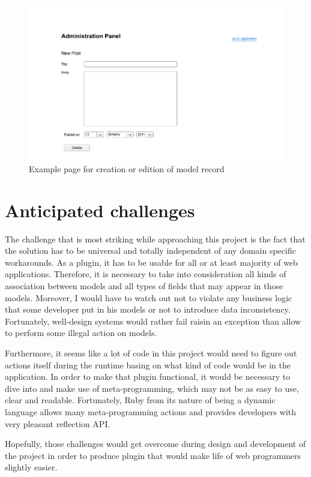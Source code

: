 	\begin{figure}[hbt!]
		\begin{center}
			\includegraphics[width=\linewidth]{images/chapter02/mockup03.png}
			\caption{Example page for creation or edition of model record}
			\label{mockup03}
		\end{center}
	\end{figure}
	
	\section{Anticipated challenges}
	The challenge that is most striking while approaching this project is the fact that the solution has to be universal and totally independent of any domain specific workarounds. As a plugin, it has to be usable for all or at least majority of web applications. Therefore, it is necessary to take into consideration all kinds of association between models and all types of fields that may appear in those models. Moreover, I would have to watch out not to violate any business logic that some developer put in his models or not to introduce data inconsistency. Fortunately, well-design systems would rather fail raisin an exception than allow to perform some illegal action on models.
	
	Furthermore, it seems like a lot of code in this project would need to figure out actions itself during the runtime basing on what kind of code would be in the application. In order to make that plugin functional, it would be necessary to dive into and make use of meta-programming, which may not be as easy to use, clear and readable. Fortunately, Ruby from its nature of being a dynamic language allows many meta-programming actions and provides developers with very pleasant reflection API.
	
	Hopefully, those challenges would get overcome during design and development of the project in order to produce plugin that would make life of web programmers slightly easier.
	
	
